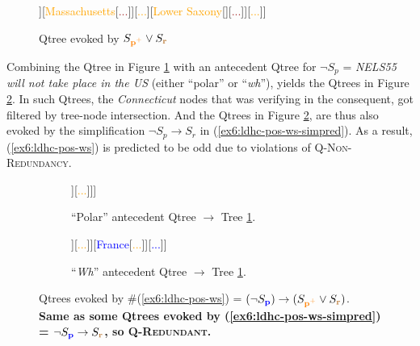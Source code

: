 \begin{figure}[H]
	\centering
	\begin{forest}
		[CS[\fbox{\textcolor{orange}{Connecticut}}[\textcolor{brown}{New Haven}][\textcolor{brown}{...}]][\textcolor{orange}{Massachusetts}[\textcolor{brown}{...}]][\textcolor{orange}{...}][\textcolor{orange}{Lower Saxony}[\fbox{\textcolor{brown}{Gottingen}}][\textcolor{brown}{...}]][\textcolor{orange}{...}]]
	\end{forest}
	\caption[]{Qtree evoked by $S_{\textbf{\textcolor{orange}{p$^+$}}} \vee S_{\textbf{\textcolor{brown}{r}}}$}\label{fig6:qtree-cvg}
\end{figure}

Combining the Qtree in Figure \ref{fig6:qtree-cvg} with an antecedent Qtree for $\neg S_p$ = \textit{NELS55 will not take place in the US} (either ``polar'' or ``\textit{wh}''), yields the Qtrees in Figure \ref{fig6:qtree-nust(cvg)}. In such Qtrees, the \textit{Connecticut} nodes that was verifying in the consequent, got filtered by tree-node intersection. And the Qtrees in Figure \ref{fig6:qtree-nust(cvg)}, are thus also evoked by the simplification $\neg S_p \rightarrow S_r$ in (\ref{ex6:ldhc-pos-ws-simpred}).  As a result, (\ref{ex6:ldhc-pos-ws}) is predicted to be odd due to violations of \textsc{Q-Non-Redundancy}.

\begin{figure}[H]
	\centering
	\begin{subfigure}[b]{.45\linewidth}
		\centering
		\begin{forest}
			[CS[\textcolor{blue}{US}] [\textcolor{blue}{$\neg$US}[\textcolor{orange}{Lower Saxony}[\fbox{\textcolor{brown}{Gottingen}}][\textcolor{brown}{...}]][\textcolor{orange}{...}]]]
		\end{forest}
		\caption{``Polar'' antecedent Qtree $\rightarrow$ Tree \ref{fig6:qtree-cvg}.}
	\end{subfigure}
	\hfill
	\begin{subfigure}[b]{.45\linewidth}
		\centering
		\begin{forest}
			[CS[\textcolor{blue}{US}] [\textcolor{blue}{Germany}[\textcolor{orange}{Lower Saxony}[\fbox{\textcolor{brown}{Gottingen}}][\textcolor{brown}{...}]][\textcolor{orange}{...}]][\textcolor{blue}{France}[\textcolor{orange}{...}]][\textcolor{blue}{...}]]
		\end{forest}
		\caption{``\textit{Wh}'' antecedent Qtree $\rightarrow$ Tree \ref{fig6:qtree-cvg}.}
	\end{subfigure}
	\caption[]{Qtrees evoked by \#(\ref{ex6:ldhc-pos-ws}) = $(\neg S_{\textbf{\textcolor{blue}{p}}}) \rightarrow (S_{\textbf{\textcolor{orange}{p$^+$}}} \vee S_{\textbf{\textcolor{brown}{r}}})$.\\\textbf{Same as some Qtrees evoked by (\ref{ex6:ldhc-pos-ws-simpred}) = $\neg S_{\textbf{\textcolor{blue}{p}}} \rightarrow S_{\textbf{\textcolor{brown}{r}}}$, so \textsc{Q-Redundant}.}}\label{fig6:qtree-nust(cvg)}
\end{figure}

